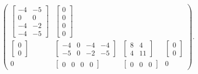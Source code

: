\begin{Example}{}{}
\[\begin{pmatrix}
\begin{bmatrix}
                                                  -4 & -5 \\
                                                  0  & 0  \\
                                                  -4 & -2 \\
                                                  -4 & -5
                                              \end{bmatrix} & \begin{bmatrix}
                                                                  0 \\0\\0\\0
                                                              \end{bmatrix} \\
            \begin{bmatrix}
                0 \\
                0
            \end{bmatrix} & \begin{bmatrix}
                                -4 & 0 & -4 & -4 \\
                                -5 & 0 & -2 & -5
                            \end{bmatrix} & \begin{bmatrix}
                                                8 & 4  \\
                                                4 & 11
                                            \end{bmatrix} & \begin{bmatrix}
                                                                0 \\
                                                                0
                                                            \end{bmatrix}   \\
            0               & \begin{bmatrix}
                                  0 & 0 & 0 & 0
                              \end{bmatrix}     & \begin{bmatrix}
                                                      0 & 0 & 0
                                                  \end{bmatrix} & 0
        \end{pmatrix}. \]
\end{Example}